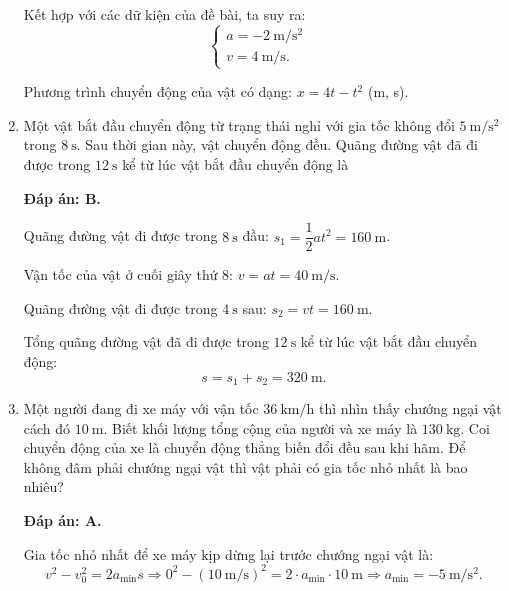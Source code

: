 \begin{enumerate}[label=\bfseries Câu \arabic*:]
{		Kết hợp với các dữ kiện của đề bài, ta suy ra:
		\begin{equation*}
			\left\{\begin{array}{ll}{a=\SI{-2}{\meter/\second^2}}&\\{v=\SI{4}{\meter/\second} .}&\end{array}\right.
		\end{equation*}
		
		Phương trình chuyển động của vật có dạng:
		$x=4t-t^2$ (m, s).
	}
	\item {}
	
	{Một vật bắt đầu chuyển động từ trạng thái nghỉ với gia tốc không đổi $\SI{5}{\meter / \second \squared}$ trong $\SI{8}{\second}$. Sau thời gian này, vật chuyển động đều. Quãng đường vật đã đi được trong $\SI{12}{\second}$ kể từ lúc vật bắt đầu chuyển động là
	}
	\hideall
	{	\textbf{Đáp án: B.}	
		
		Quãng đường vật đi được trong $\SI{8}{\second}$ đầu: $s_1=\dfrac{1}{2}at^2=\SI{160}{\meter}$.
		
		Vận tốc của vật ở cuối giây thứ 8: $v=at=\SI{40}{\meter / \second}$.
		
		Quãng đường vật đi được trong $\SI{4}{\second}$ sau:
		$s_2=vt=\SI{160}{\meter}$.
		
		Tổng quãng đường vật đã đi được trong $\SI{12}{\second}$ kể từ lúc vật bắt đầu chuyển động: $$s=s_1+s_2=\SI{320}{\meter}.$$
		
	}
	
	\item {}
	
	{Một người đang đi xe máy với vận tốc $\SI{36}{\kilo\meter/\hour}$ thì nhìn thấy chướng ngại vật cách đó $\SI{10}{\meter}$. Biết khối lượng tổng cộng của người và xe máy là $\SI{130}{\kilogram}$. Coi chuyển động của xe là chuyển động thẳng biến đổi đều sau khi hãm. Để không đâm phải chướng ngại vật thì vật phải có gia tốc nhỏ nhất là bao nhiêu?
		
	}
	\hideall
	{	\textbf{Đáp án: A.}
		
		Gia tốc nhỏ nhất để xe máy kịp dừng lại trước chướng ngại vật là:
		$$v^2-v_0^2=2a_\text{min} s\Rightarrow 0^2-(\SI{10}{\meter/\second})^2=2\cdot a_\text{min} \cdot \SI{10}{\meter}\Rightarrow a_\text{min}=\SI{-5}{\meter/\second^2}.$$
	}
\end{enumerate}




